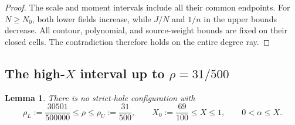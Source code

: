\documentclass[11pt,reqno]{amsart}
\numberwithin{equation}{section}
\newtheorem{lemma}[theorem]{Lemma}
\theoremstyle{definition}
\theoremstyle{remark}
\begin{document}
\begin{proof}
The scale and moment intervals include all their common endpoints.
For $N\ge N_0$, both lower fields increase, while $J/N$ and
$1/n$ in the upper bounds decrease. All contour, polynomial,
and source-weight bounds are fixed on their closed cells.
The contradiction therefore holds on the entire degree ray.
\end{proof}

\subsection{The high-\texorpdfstring{$X$}{X} interval up to
\texorpdfstring{$\rho=31/500$}{rho=31/500}}

\begin{lemma}\label{sm:T-highX-extension}
There is no strict-hole configuration with
\[
 \rho_L:=\frac{30501}{500000}\le\rho\le
 \rho_U:=\frac{31}{500},\qquad
 X_0:=\frac{69}{100}\le X\le1,\qquad
 0<\alpha\le X .
\]
\end{lemma}
\end{document}
